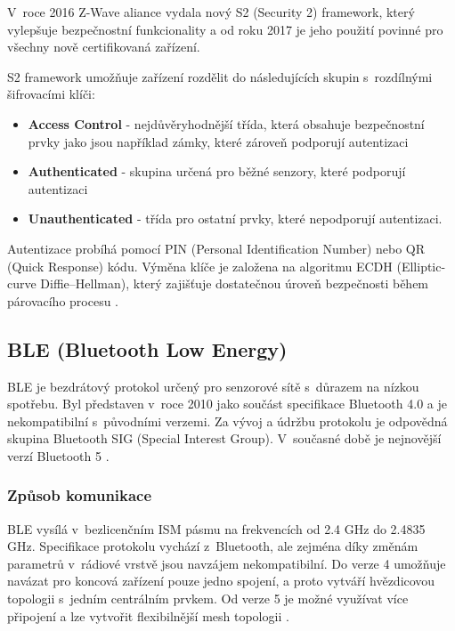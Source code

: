  V~roce 2016 Z-Wave aliance vydala nový S2 (Security 2) framework, který vylepšuje bezpečnostní funkcionality 
 a od roku 2017 je jeho použití povinné pro všechny nově certifikovaná zařízení. 
 
 S2 framework umožňuje zařízení rozdělit do následujících skupin s~rozdílnými šifrovacími klíči:
 \begin{itemize}
  \item \textbf{Access Control} - 
   nejdůvěryhodnější třída, která obsahuje bezpečnostní prvky jako jsou například zámky,
   které zároveň podporují autentizaci
  \item \textbf{Authenticated} - 
  skupina určená pro běžné senzory, které podporují autentizaci 
  \item \textbf{Unauthenticated} - 
  třída pro ostatní prvky, které nepodporují autentizaci.
 \end{itemize}
 Autentizace probíhá pomocí PIN (Personal Identification Number) nebo QR (Quick Response) kódu.
 Výměna klíče je založena na algoritmu ECDH (Elliptic-curve Diffie–Hellman), který zajišťuje 
 dostatečnou úroveň bezpečnosti během párovacího procesu \cite{cesnet-survey}.

 
  \subsection{BLE (Bluetooth Low Energy)} 
  BLE je bezdrátový protokol určený pro senzorové sítě s~důrazem na nízkou spotřebu. Byl představen 
  v~roce 2010 jako součást specifikace Bluetooth 4.0 a je nekompatibilní s~původními verzemi. 
  Za vývoj a údržbu protokolu je odpovědná skupina Bluetooth SIG (Special Interest Group).
  V~současné době je nejnovější verzí Bluetooth 5 \cite{cesnet-survey}.
  
  \subsubsection{Způsob komunikace}
  BLE vysílá v~bezlicenčním ISM pásmu na frekvencích od 2.4 GHz do 2.4835 GHz. Specifikace
  protokolu vychází z~Bluetooth, ale zejména díky změnám parametrů v~rádiové vrstvě 
  jsou navzájem nekompatibilní. Do verze 4 umožňuje navázat pro koncová zařízení pouze jedno spojení,
  a proto 
  vytváří hvězdicovou topologii s~jedním centrálním prvkem. Od verze 5 je možné využívat více připojení
  a lze vytvořit flexibilnější mesh topologii \cite{cesnet-survey}. 
  
